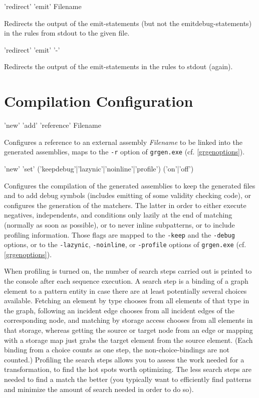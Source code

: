 \begin{rail}
'redirect' 'emit' Filename
\end{rail}
Redirects the output of the emit-statements (but not the emitdebug-statements) in the rules from stdout to the given file.

\begin{rail}
'redirect' 'emit' '-'
\end{rail}
Redirects the output of the emit-statements in the rules to stdout (again).


\section{Compilation Configuration}\label{sec:compilerconfigshell}

\begin{rail}
  'new' 'add' 'reference' Filename
\end{rail}
Configures a reference to an external assembly \emph{Filename} to be linked into the generated assemblies, maps to the \texttt{-r} option of \texttt{grgen.exe} (cf. \ref{grgenoptions}).

\begin{rail}
  'new' 'set' ('keepdebug'|'lazynic'|'noinline'|'profile') ('on'|'off')
\end{rail}
Configures the compilation of the generated assemblies to keep the generated files and to add debug symbols (includes emitting of some validity checking code),
or configures the generation of the matchers.
The latter in order to either execute negatives, independents, and conditions only lazily at the end of matching (normally as soon as possible),
or to never inline subpatterns,
or to include profiling information.
Those flags are mapped to the \texttt{-keep} and the \texttt{-debug} options, or to the \texttt{-lazynic}, \texttt{-noinline}, or  \texttt{-profile} options of \texttt{grgen.exe} (cf. \ref{grgenoptions}).

When profiling is turned on, the number of search steps carried out is printed to the console after each sequence execution.
A search step is a binding of a graph element to a pattern entity in case there are at least potentially several choices available.
Fetching an element by type chooses from all elements of that type in the graph, following an incident edge chooses from all incident edges of the corresponding node, and matching by storage access chooses from all elements in that storage, whereas getting the source or target node from an edge or mapping with a storage map just grabs the target element from the source element.
(Each binding from a choice counts as one step, the non-choice-bindings are not counted.)
Profiling the search steps allows you to assess the work needed for a transformation, to find the hot spots worth optimizing.
The less search steps are needed to find a match the better (you typically want to efficiently find patterns and minimize the amount of search needed in order to do so). 


